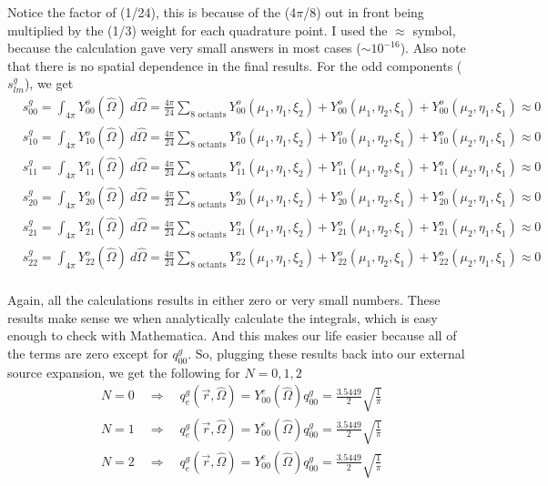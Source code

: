\documentclass[10pt]{article}
\begin{document}
Notice the factor of (1/24), this is because of the (4$\pi$/8) out in front being multiplied by the (1/3) weight for each quadrature point. I used the $\approx$ symbol, because the calculation gave very small answers in most cases ($\sim 10^{-16}$). Also note that there is no spatial dependence in the final results. For the odd components ($s_{lm}^g$), we get
%
\begin{align*}
  &s_{00}^g = \int_{4\pi}Y_{00}^o(\hat{\Omega})\:d\hat{\Omega} = \frac{4\pi}{24}\sum_{\textrm{8 octants}}Y_{00}^o(\mu_1,\eta_1,\xi_2) + Y_{00}^o(\mu_1,\eta_2,\xi_1) + Y_{00}^o(\mu_2,\eta_1,\xi_1) \approx 0 \\
  &s_{10}^g =\int_{4\pi}Y_{10}^o(\hat{\Omega})\:d\hat{\Omega} = \frac{4\pi}{24}\sum_{\textrm{8 octants}}Y_{10}^o(\mu_1,\eta_1,\xi_2) + Y_{10}^o(\mu_1,\eta_2,\xi_1) + Y_{10}^o(\mu_2,\eta_1,\xi_1) \approx 0 \\
  &s_{11}^g =\int_{4\pi}Y_{11}^o(\hat{\Omega})\:d\hat{\Omega} = \frac{4\pi}{24}\sum_{\textrm{8 octants}}Y_{11}^o(\mu_1,\eta_1,\xi_2) + Y_{11}^o(\mu_1,\eta_2,\xi_1) + Y_{11}^o(\mu_2,\eta_1,\xi_1) \approx 0 \\
  &s_{20}^g =\int_{4\pi}Y_{20}^o(\hat{\Omega})\:d\hat{\Omega} = \frac{4\pi}{24}\sum_{\textrm{8 octants}}Y_{20}^o(\mu_1,\eta_1,\xi_2) + Y_{20}^o(\mu_1,\eta_2,\xi_1) + Y_{20}^o(\mu_2,\eta_1,\xi_1) \approx 0 \\
  &s_{21}^g =\int_{4\pi}Y_{21}^o(\hat{\Omega})\:d\hat{\Omega} = \frac{4\pi}{24}\sum_{\textrm{8 octants}}Y_{21}^o(\mu_1,\eta_1,\xi_2) + Y_{21}^o(\mu_1,\eta_2,\xi_1) + Y_{21}^o(\mu_2,\eta_1,\xi_1) \approx 0 \\
  &s_{22}^g =\int_{4\pi}Y_{22}^o(\hat{\Omega})\:d\hat{\Omega} = \frac{4\pi}{24}\sum_{\textrm{8 octants}}Y_{22}^o(\mu_1,\eta_1,\xi_2) + Y_{22}^o(\mu_1,\eta_2,\xi_1) + Y_{22}^o(\mu_2,\eta_1,\xi_1) \approx 0 \\
\end{align*}

Again, all the calculations results in either zero or very small numbers. These results make sense we when analytically calculate the integrals, which is easy enough to check with Mathematica. And this makes our life easier because all of the terms are zero except for $q_{00}^g$. So, plugging these results back into our external source expansion, we get the following for $N=0,1,2$
%
\begin{align*}
    &N = 0 \quad \Rightarrow \quad q_e^g(\vec{r},\hat{\Omega}) = Y_{00}^e(\hat{\Omega}) q_{00}^g = \frac{3.5449}{2} \sqrt{\frac{1}{\pi}}\\
    &N = 1 \quad \Rightarrow \quad q_e^g(\vec{r},\hat{\Omega}) = Y_{00}^e(\hat{\Omega}) q_{00}^g = \frac{3.5449}{2} \sqrt{\frac{1}{\pi}}\\
    &N = 2 \quad \Rightarrow \quad q_e^g(\vec{r},\hat{\Omega}) = Y_{00}^e(\hat{\Omega}) q_{00}^g = \frac{3.5449}{2} \sqrt{\frac{1}{\pi}}
\end{align*}
\end{document}
